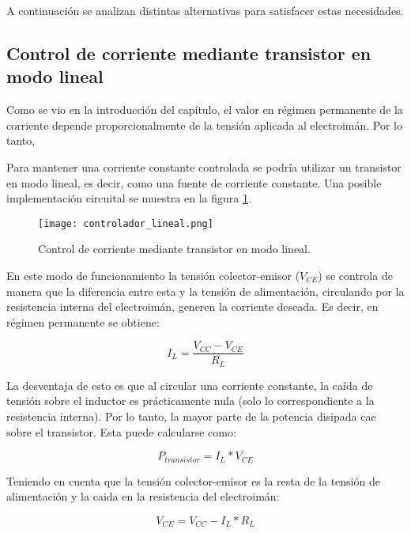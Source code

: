 A continuación se analizan distintas alternativas para satisfacer estas necesidades.

\subsection{Control de corriente mediante transistor en modo lineal}

Como se vio en la introducción del capítulo, el valor en régimen permanente de la corriente depende proporcionalmente de la tensión aplicada al electroimán. Por lo tanto, 

Para mantener una corriente constante controlada se podría utilizar un transistor en modo lineal, es decir, como una fuente de corriente constante. Una posible implementación circuital se muestra en la figura \ref{fig:img_controlador-lineal}.

\begin{figure}[H]
	\centering
	\texttt{[image: controlador\_lineal.png]}
	\caption{Control de corriente mediante transistor en modo lineal.}
	\label{fig:img_controlador-lineal}
\end{figure}

En este modo de funcionamiento la tensión colector-emisor ($V_{CE}$) se controla de manera que la diferencia entre esta y la tensión de alimentación, circulando por la resistencia interna del electroimán, generen la corriente deseada. Es decir, en régimen permanente se obtiene:
 
 \begin{equation} \label{eq_corriente_temporal}
 	I_L=\frac{V_{CC}-V_{CE}}{R_L}
 \end{equation}
 
La desventaja de esto es que al circular una corriente constante, la caída de tensión sobre el inductor es prácticamente nula (solo lo correspondiente a la resistencia interna). Por lo tanto, la mayor parte de la potencia disipada cae sobre el transistor. Esta puede calcularse como: 

\begin{equation}
	P_{transistor} = I_L*V_{CE}
\end{equation}

Teniendo en cuenta que la tensión colector-emisor es la resta de la tensión de alimentación y la caida en la resistencia del electroimán:

\begin{equation}
	V_{CE}=V_{CC}-I_L*R_L
\end{equation}

